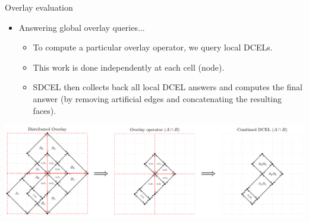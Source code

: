 \documentclass{beamer}
\begin{document}
   \begin{frame}{Overlay evaluation}
        \begin{itemize}
            \item Answering global overlay queries...
            \begin{itemize}
                \item To compute a particular overlay operator, we query local DCELs.
                \item This work is done independently at each cell (node).
                \item SDCEL then collects back all local DCEL answers and computes the final answer (by removing artificial edges and concatenating the resulting faces).
            \end{itemize}
        \end{itemize}
        \vspace{0.5cm}

        \centering
        \includegraphics[width=\textwidth]{figures/overlay_operator}
    \end{frame}
\end{document}
